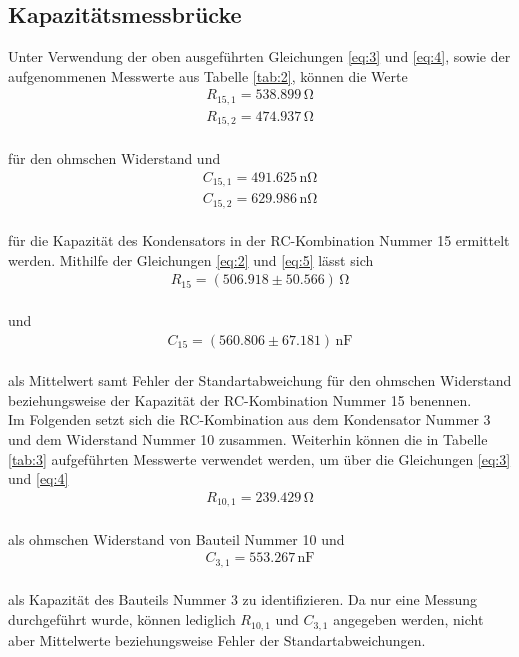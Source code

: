 \subsection{Kapazitätsmessbrücke}

Unter Verwendung der oben ausgeführten Gleichungen \ref{eq:3} und \ref{eq:4}, sowie der aufgenommenen
Messwerte aus Tabelle \ref{tab:2}, können die Werte 
\begin{align}
R_{15,1} = 538.899\,\si{\ohm} \nonumber \\
R_{15,2} = 474.937\,\si{\ohm} \nonumber  
\end{align}
\\
für den ohmschen Widerstand und
\begin{align}
C_{15,1} = 491.625\,\si{\nano\ohm} \nonumber \\
C_{15,2} = 629.986\,\si{\nano\ohm} \nonumber 
\end{align}
\\
für die Kapazität des Kondensators in der RC-Kombination Nummer 15 ermittelt werden.
Mithilfe der Gleichungen \ref{eq:2} und \ref{eq:5}
lässt sich 
\begin{align}
R_{15} = (506.918 \pm 50.566)\, \si{\ohm} \nonumber 
\end{align}
\\
und
\begin{align}
C_{15} = (560.806 \pm 67.181)\, \si{\nano\farad} \nonumber 
\end{align}
\\
als Mittelwert samt Fehler der Standartabweichung für den ohmschen Widerstand beziehungsweise der
Kapazität der RC-Kombination Nummer 15 benennen.
\\
Im Folgenden setzt sich die RC-Kombination aus dem Kondensator Nummer 3 und dem Widerstand Nummer 10 zusammen. Weiterhin 
können die in Tabelle \ref{tab:3} aufgeführten Messwerte verwendet werden, um über die Gleichungen
\ref{eq:3} und \ref{eq:4}
\begin{align}
R_{10,1} = 239.429\, \si{\ohm} \nonumber
\end{align}
\\
als ohmschen Widerstand von Bauteil Nummer 10 und
\begin{align}
C_{3,1} = 553.267\, \si{\nano\farad} \nonumber
\end{align}
\\
als Kapazität des Bauteils Nummer 3 zu identifizieren. Da nur eine Messung durchgeführt wurde, können lediglich $R_{10,1}$
und $C_{3,1}$ angegeben werden, nicht aber Mittelwerte beziehungsweise Fehler der Standartabweichungen.


